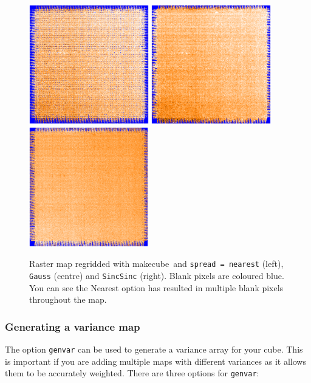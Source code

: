 \documentclass[twoside,11pt]{article}
\newcommand{\xref}[3]{#1}
\renewcommand{\_}{\texttt{\symbol{95}}}
\newcommand{\task}[1]{\textsf{#1}}
\newcommand{\param}[1]{\texttt{#1}}
\newcommand{\makecube}{\xref{\task{makecube}}{sun258}{MAKECUBE}}
\begin{document}
\begin{figure}[h!]
\begin{center}
\includegraphics[width=5.2cm, height=5.2cm]{sc20_nearest.eps}
\includegraphics[width=5.2cm, height=5.2cm]{sc20_gauss.eps}
\includegraphics[width=5.2cm, height=5.2cm]{sc20_sincsinc.eps}
\label{fig:spread}
\caption[Options for the \makecube\ parameter `spread']{Raster map regridded with \makecube\ and \param{spread = nearest} (left), \param{Gauss} (centre) and \param{SincSinc} (right). Blank pixels are coloured blue. You can see the Nearest option has resulted in multiple blank pixels throughout the map.}
\end{center}
\end{figure}



\subsubsection{Generating a variance map}
The option  \param{genvar} can be used to generate a variance array for your cube. This is important if you are adding multiple maps with different variances as it allows them to be accurately weighted. There are three options for  \param{genvar}:
\end{document}
